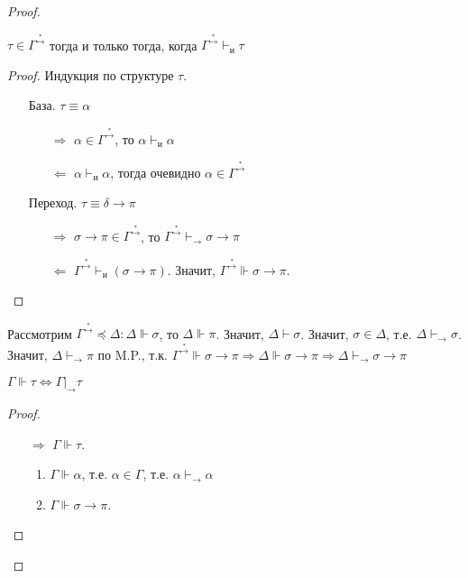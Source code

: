 \begin{proof}
    \begin{statement}
        \(\tau \in \Gamma^{\stackrel{*}{\to}}\) тогда и только тогда, когда \(\Gamma^{\stackrel{*}{\to}} \vdash_{\mathrm{и}} \tau\)
    \end{statement}
    \begin{proof}
        Индукция по структуре \(\tau\).
        \begin{itemize}
            \item [База.] \(\tau \equiv \alpha\)
                \begin{itemize}
                    \item [\( \Rightarrow \)] \(\alpha \in \Gamma^{\stackrel{*}{\to}}\), то \(\alpha \vdash_{\mathrm{и}} \alpha\)
                    \item [\( \Leftarrow \)] \(\alpha \vdash_{\mathrm{и}} \alpha\), тогда очевидно \(\alpha \in \Gamma^{\stackrel{*}{\to}}\)
                \end{itemize}
            \item [Переход.] \(\tau \equiv \delta \to \pi\)
            \begin{itemize}
                \item [\( \Rightarrow \)] \(\sigma \to \pi \in \Gamma^{\stackrel{*}{\to}}\), то \(\Gamma^{\stackrel{*}{\to}} \vdash_{\to} \sigma \to \pi\) 
                \item [\( \Leftarrow \)] \(\Gamma^{\stackrel{*}{\to}} \vdash_{\mathrm{и}} (\sigma \to \pi)\). Значит, \(\Gamma^{\stackrel{*}{\to}} \Vdash \sigma \to \pi\).
            \end{itemize}
        \end{itemize}
    \end{proof}
        
    Рассмотрим \(\Gamma^{\stackrel{*}{\to}} \preceq \Delta : \Delta \Vdash \sigma\), то \(\Delta \Vdash \pi\). Значит, \(\Delta \vdash \sigma\). Значит, \(\sigma \in \Delta\), т.е. \(\Delta \vdash_{\to} \sigma\). Значит, \(\Delta \vdash_{\to} \pi\) по M.P., т.к. \(\Gamma^{\stackrel{*}{\to}} \Vdash \sigma \to \pi \Rightarrow \Delta \Vdash \sigma \to \pi \Rightarrow \Delta \vdash_{\to} \sigma \to \pi\)
    
    \begin{statement}
        \(\Gamma \Vdash \tau \Leftrightarrow \Gamma |_{\to} \tau\)
    \end{statement}
    \begin{proof}\itemfix
        \begin{itemize}
            \item [\( \Rightarrow \)] \(\Gamma \Vdash \tau\).
                \begin{enumerate}
                    \item \(\Gamma \Vdash \alpha\), т.е. \(\alpha \in \Gamma\), т.е. \(\alpha \vdash_{ \to } \alpha\)
                    \item \(\Gamma \Vdash \sigma \to \pi\).
                    

\end{enumerate}
\end{itemize}
\end{proof}
\end{proof}
